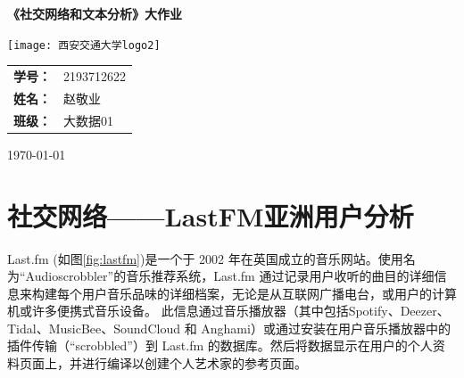 \documentclass[10pt, a4paper]{article}
\begin{document}
	
	\begin{titlepage}
		\begin{center}
			\vspace*{3cm}
			
			\Huge
			\textbf{《社交网络和文本分析》大作业}
			
			\vspace{1cm}
	
			\vspace{3.5cm}
					\texttt{[image: 西安交通大学logo2]}
			
			\vfill
			
			
			\Large
			\begin{center}
				\begin{tabular}{rl}
					\textbf{学号：}& 2193712622\\
					\textbf{姓名：}& 赵敬业\\
					\textbf{班级：}& 大数据01\\

				\end{tabular}
			\end{center}




			
			\Large
			
			\today
			
		\end{center}
	\end{titlepage}
	
	
\newpage
\tableofcontents
\newpage

\section{社交网络——LastFM亚洲用户分析}

Last.fm (如图\ref{fig:lastfm})是一个于 2002 年在英国成立的音乐网站。\cite{ContributorstoWikimediaprojects2022Jun}使用名为“Audioscrobbler”的音乐推荐系统，Last.fm 通过记录用户收听的曲目的详细信息来构建每个用户音乐品味的详细档案，无论是从互联网广播电台，或用户的计算机或许多便携式音乐设备。 此信息通过音乐播放器（其中包括Spotify、Deezer、Tidal、MusicBee、SoundCloud 和 Anghami）或通过安装在用户音乐播放器中的插件传输（“scrobbled”）到 Last.fm 的数据库。然后将数据显示在用户的个人资料页面上，并进行编译以创建个人艺术家的参考页面。
\end{document}
